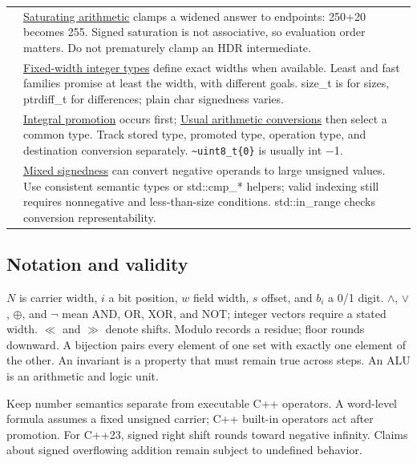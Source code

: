 {\begin{longtable}[]{@{}
  >{\raggedright\arraybackslash}p{}
  >{\raggedright\arraybackslash}p{}@{}}
37 & \hyperref[appendix-3999c6209649]{Saturating arithmetic} clamps a widened answer to endpoints: 250+20 becomes 255. Signed saturation is not associative, so evaluation order matters. Do not prematurely clamp an HDR intermediate. \\
38 & \hyperref[appendix-cc04044b5782]{Fixed-width integer types} define exact widths when available. Least and fast families promise at least the width, with different goals. size\_t is for sizes, ptrdiff\_t for differences; plain char signedness varies. \\
39 & \hyperref[appendix-45303d03796a]{Integral promotion} occurs first; \hyperref[appendix-5e2d663adf7f]{Usual arithmetic conversions} then select a common type. Track stored type, promoted type, operation type, and destination conversion separately. \texttt{\textasciitilde{}uint8\_t\{0\}} is usually int −1. \\
40 & \hyperref[appendix-736a2345de4a]{Mixed signedness} can convert negative operands to large unsigned values. Use consistent semantic types or std::cmp\_* helpers; valid indexing still requires nonnegative and less-than-size conditions. std::in\_range checks conversion representability. \\
\end{longtable}
}

\subsection{Notation and validity}\label{appendix-fd090d982a15-notation-and-validity}

\hypertarget{appendix-fd090d982a15-notation-and-validity}{}

\(N\) is carrier width, \(i\) a bit position, \(w\) field width, \(s\) offset, and \(b_i\) a 0/1 digit. \(\land\), \(\lor\), \(\oplus\), and \(\neg\) mean AND, OR, XOR, and NOT; integer vectors require a stated width. \(\ll\) and \(\gg\) denote shifts. Modulo records a residue; floor rounds downward. A bijection pairs every element of one set with exactly one element of the other. An invariant is a property that must remain true across steps. An ALU is an arithmetic and logic unit.

Keep number semantics separate from executable C++ operators. A word-level formula assumes a fixed unsigned carrier; C++ built-in operators act after promotion. For C++23, signed right shift rounds toward negative infinity. Claims about signed overflowing addition remain subject to undefined behavior.


